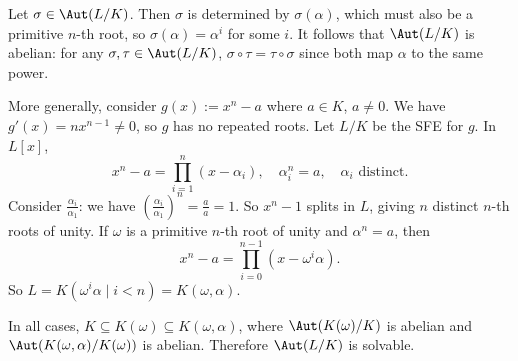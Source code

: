 \documentclass[a4paper,12pt]{article}
\begin{document}
Let $\sigma\in\Aut(L/K)$. Then $\sigma$ is determined by $\sigma(\alpha)$, which must also be a primitive $n$-th root, so $\sigma(\alpha)=\alpha^i$ for some $i$. It follows that $\Aut(L/K)$ is abelian: for any $\sigma,\tau\in\Aut(L/K)$, $\sigma\circ\tau=\tau\circ\sigma$ since both map $\alpha$ to the same power.

More generally, consider $g(x):=x^n-a$ where $a\in K$, $a\neq 0$. We have $g'(x)=nx^{n-1}\neq 0$, so $g$ has no repeated roots. Let $L/K$ be the SFE for $g$. In $L[x]$,
\[
x^n-a=\prod_{i=1}^n(x-\alpha_i),\quad \alpha_i^n=a,\quad \alpha_i\text{ distinct}
.\]
Consider $\frac{\alpha_i}{\alpha_1}$: we have $\left(\frac{\alpha_i}{\alpha_1}\right)^n=\frac{a}{a}=1$. So $x^n-1$ splits in $L$, giving $n$ distinct $n$-th roots of unity. If $\omega$ is a primitive $n$-th root of unity and $\alpha^n=a$, then
\[
x^n-a=\prod_{i=0}^{n-1}(x-\omega^i\alpha)
.\]
So $L=K(\omega^i\alpha\mid i<n)=K(\omega,\alpha)$.

In all cases, $K\subseteq K(\omega)\subseteq K(\omega,\alpha)$, where $\Aut(K(\omega)/K)$ is abelian and $\Aut(K(\omega,\alpha)/K(\omega))$ is abelian. Therefore $\Aut(L/K)$ is solvable.
\newpage
\end{document}
